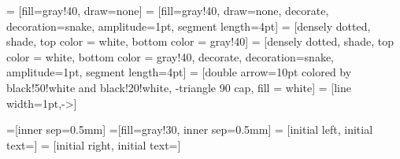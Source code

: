  = [fill=gray!40, draw=none]
 = [fill=gray!40, draw=none, decorate, decoration={snake, amplitude=1pt, segment length=4pt}]
 = [densely dotted, shade, top color = white, bottom color = gray!40]
 = [densely dotted, shade, top color = white, bottom color = gray!40, decorate, decoration={snake, amplitude=1pt, segment length=4pt}]
 = [double arrow=10pt colored by black!50!white and black!20!white, -triangle 90 cap, fill = white]%
 = [line width=1pt,->]%


\newcommand{\stateexample}[4]{#1, #2, #3, #4}
\newcommand{\hear}[1]{h_#1}
\newcommand{\eventattentionbasedannouncement}[3]{\eventinfigure{#1 {\land} #2 {\land} #3}{\postconditiontrivial}}





\newcommand{\muddyproposition}[1]{m_{#1}}


\newcommand{\languageDELsuccinct}{\mathscr{L}_{succDEL}}



\newcommand{\booleanformula}{\beta}



\newcommand\valuationset[1]{\mathcal V(#1)}
\newcommand{\formulaofvaluation}[1]{desc(#1)}
\newcommand{\formulaexistenceunicite}[1]{\exists!(#1)}



\newcommand{\valuationelement}{v}


\newcommand{\valuationfont}{\mathtt}

\newcommand{\mainprocedure}{main}


=[inner sep=0.5mm]
=[fill=gray!30, inner sep=0.5mm]
 = [initial left, initial text={}]
 = [initial right, initial text={}]


\newcommand{\eventinfigure}[2]{\scriptsize\hspace{-1mm}\ensuremath{\begin{array}{l}pre: #1 \\ post: #2\end{array}}\hspace{-2mm}}

